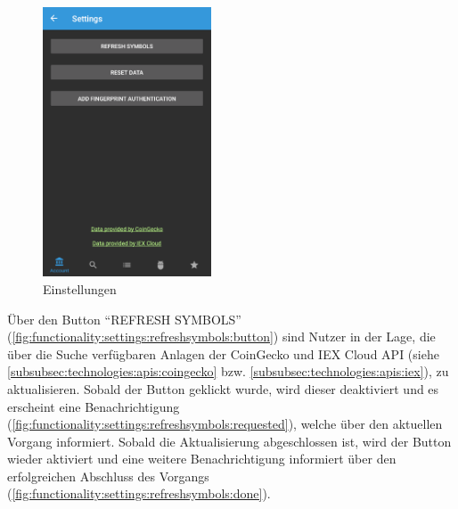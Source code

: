 \documentclass[a4paper]{article}
\begin{document}
\begin{figure}[H]
	\centering
	\includegraphics[width=.5\textwidth,height=8cm,keepaspectratio]{./images/settings/raw.png}
	\caption{Einstellungen}
	\label{fig:functionality:settings}
\end{figure}


Über den Button "`REFRESH SYMBOLS"' (\autoref{fig:functionality:settings:refreshsymbols:button}) sind Nutzer in der Lage, die über die Suche verfügbaren Anlagen der CoinGecko und IEX Cloud API (siehe \autoref{subsubsec:technologies:apis:coingecko} bzw. \autoref{subsubsec:technologies:apis:iex}), zu aktualisieren. Sobald der Button geklickt wurde, wird dieser deaktiviert und es erscheint eine Benachrichtigung (\autoref{fig:functionality:settings:refreshsymbols:requested}), welche über den aktuellen Vorgang informiert. Sobald die Aktualisierung abgeschlossen ist, wird der Button wieder aktiviert und eine weitere Benachrichtigung informiert über den erfolgreichen Abschluss des Vorgangs (\autoref{fig:functionality:settings:refreshsymbols:done}).
\end{document}
